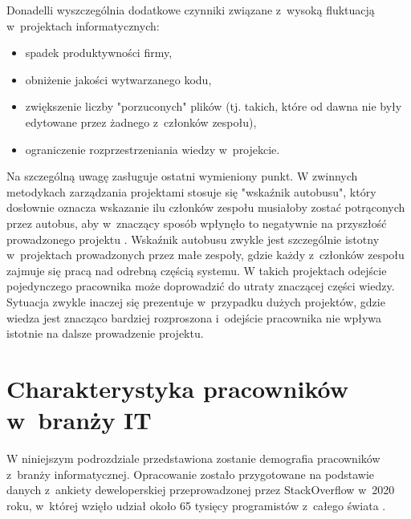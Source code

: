 Donadelli \cite{donadelli-2015} wyszczególnia dodatkowe czynniki związane z~wysoką fluktuacją w~projektach informatycznych:
\begin{itemize}
    \item spadek produktywności firmy,
    \item obniżenie jakości wytwarzanego kodu,
    \item zwiększenie liczby "porzuconych" plików (tj. takich, które od dawna nie były edytowane przez żadnego z~członków zespołu),
    \item ograniczenie rozprzestrzeniania wiedzy w~projekcie.
\end{itemize}

Na szczególną uwagę zasługuje ostatni wymieniony punkt.
W zwinnych metodykach zarządzania projektami stosuje się "wskaźnik autobusu", który dosłownie oznacza wskazanie ilu członków zespołu musiałoby zostać potrąconych przez autobus, aby w~znaczący sposób wpłynęło to negatywnie na przyszłość prowadzonego projektu \cite{truck-factor-2005}.
Wskaźnik autobusu zwykle jest szczególnie istotny w~projektach prowadzonych przez małe zespoły, gdzie każdy z~członków zespołu zajmuje się pracą nad odrebną częścią systemu.
W takich projektach odejście pojedynczego pracownika może doprowadzić do utraty znaczącej części wiedzy.
Sytuacja zwykle inaczej się prezentuje w~przypadku dużych projektów, gdzie wiedza jest znacząco bardziej rozproszona i~odejście pracownika nie wpływa istotnie na dalsze prowadzenie projektu.

%
%


%
%


\section{Charakterystyka pracowników w~branży IT}

W niniejszym podrozdziale przedstawiona zostanie demografia pracowników z~branży informatycznej.
Opracowanie zostało przygotowane na podstawie danych z~ankiety deweloperskiej przeprowadzonej przez StackOverflow w~2020 roku, w~której wzięło udział około 65 tysięcy programistów z~całego świata \cite{so-survey-2020}.

